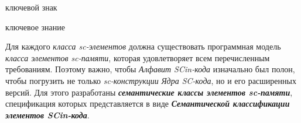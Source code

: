 \begin{SCn}
	
\begin{scnrelfromlist}{ключевой знак}
\end{scnrelfromlist}

\begin{scnrelfromlist}{ключевое знание}
\end{scnrelfromlist}	
	
\end{SCn}

Для каждого \textit{класса sc-элементов} должна существовать программная модель \textit{класса элементов sc-памяти\scnsupergroupsign}, которая удовлетворяет всем перечисленным требованиям. Поэтому важно, чтобы \textit{Алфавит SCin-кода} изначально был полон, чтобы погрузить не только \textit{sc-конструкции} \textit{Ядра SC-кода}, но и его расширенных версий. Для этого разработаны \textbf{\textit{семантические классы элементов sc-памяти\scnsupergroupsign}}, спецификация которых представляется в виде \textbf{\textit{Семантической классификации элементов SCin-кода}}.

